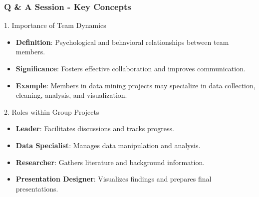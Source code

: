 \documentclass[aspectratio=169]{beamer}
\begin{document}
\begin{frame}[fragile]
    \frametitle{Q \& A Session - Key Concepts}
    \begin{block}{1. Importance of Team Dynamics}
        \begin{itemize}
            \item \textbf{Definition}: Psychological and behavioral relationships between team members.
            \item \textbf{Significance}: Fosters effective collaboration and improves communication.
            \item \textbf{Example}: Members in data mining projects may specialize in data collection, cleaning, analysis, and visualization. 
        \end{itemize}
    \end{block}

    \begin{block}{2. Roles within Group Projects}
        \begin{itemize}
            \item \textbf{Leader}: Facilitates discussions and tracks progress.
            \item \textbf{Data Specialist}: Manages data manipulation and analysis.
            \item \textbf{Researcher}: Gathers literature and background information.
            \item \textbf{Presentation Designer}: Visualizes findings and prepares final presentations.
        \end{itemize}
    \end{block}
\end{frame}
\end{document}
